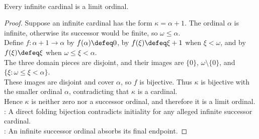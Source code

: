 \begin{lemma} \label{lem:infinite-cardinals-are-limit-ordinals} \\
Every infinite cardinal is a limit ordinal.
\begin{proof}
Suppose an infinite cardinal has the form $\kappa=\alpha+1$. The ordinal $\alpha$ is infinite, otherwise its successor would be finite, so $\omega\leq\alpha$.\\
Define $f:\alpha+1\to\alpha$ by $f(\alpha)\defeq0$, by $f(\xi)\defeq\xi+1$ when $\xi<\omega$, and by $f(\xi)\defeq\xi$ when $\omega\leq\xi<\alpha$.\\
The three domain pieces are disjoint, and their images are $\{0\}$, $\omega\setminus\{0\}$, and $\{\xi:\omega\leq\xi<\alpha\}$.\\
These images are disjoint and cover $\alpha$, so $f$ is bijective. Thus $\kappa$ is bijective with the smaller ordinal $\alpha$, contradicting that $\kappa$ is a cardinal.\\
Hence $\kappa$ is neither zero nor a successor ordinal, and therefore it is a limit ordinal.\\
: A direct folding bijection contradicts initiality for any alleged infinite successor cardinal.\\
: An infinite successor ordinal absorbs its final endpoint.
\end{proof}
\end{lemma}
